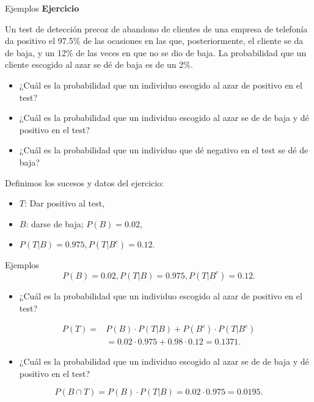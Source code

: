 \documentclass[
  ignorenonframetext,
  aspectratio=169]{beamer}
\providecommand{\tightlist}{%
  \setlength{\itemsep}{0pt}\setlength{\parskip}{0pt}}\usepackage{longtable,booktabs,array}
\begin{document}
\begin{frame}{Ejemplos}
\label{ejemplos-8}
\textbf{Ejercicio}

Un test de detección precoz de abandono de clientes de una empresa de
telefonía da positivo el 97.5\% de las ocasiones en las que,
posteriormente, el cliente se da de baja, y un 12\% de las veces en que
no se dio de baja. La probabilidad que un cliente escogido al azar se dé
de baja es de un 2\%.

\begin{itemize}
\tightlist
\item
  ¿Cuál es la probabilidad que un individuo escogido al azar de positivo
  en el test?
\item
  ¿Cuál es la probabilidad que un individuo escogido al azar se de de
  baja y dé positivo en el test?
\item
  ¿Cuál es la probabilidad que un individuo que dé negativo en el test
  se dé de baja?
\end{itemize}

Definimos los sucesos y datos del ejercicio:

\begin{itemize}
\tightlist
\item
  \(T\): Dar positivo al test,
\item
  \(B\): darse de baja; \(P(B)=0.02\),
\item
  \(P(T|B)=0.975, P(T|B^c)=0.12\).
\end{itemize}
\end{frame}

\begin{frame}{Ejemplos}
\label{ejemplos-9}
\[P(B)=0.02, P(T|B)=0.975, P(T|B^c)=0.12.\]

\begin{itemize}
\tightlist
\item
  ¿Cuál es la probabilidad que un individuo escogido al azar de positivo
  en el test?
\end{itemize}

\[
\begin{array}{rl}
P(T) = & P(B)\cdot P(T|B)+P(B^c)\cdot P(T|B^c)\\[1ex]
& =0.02\cdot 0.975+0.98\cdot 0.12=0.1371.
\end{array}
\]

\begin{itemize}
\tightlist
\item
  ¿Cuál es la probabilidad que un individuo escogido al azar se de de
  baja y dé positivo en el test?
\end{itemize}

\[P(B\cap T)= P(B)\cdot P(T|B)=0.02\cdot 0.975=0.0195.\]
\end{frame}
\end{document}
